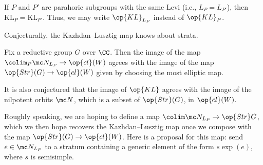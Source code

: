 \documentclass[../notes.tex]{subfiles}
\begin{document}
\begin{remark}
	If $P$ and $P'$ are parahoric subgroups with the same Levi (i.e., $L_P=L_{P'}$), then $\mathrm{KL}_{P}=\mathrm{KL}_{{P'}}$. Thus, we may write $\op{KL}_{L_P}$ instead of $\op{KL}_P$.
\end{remark}
Conjecturally, the Kazhdan--Lusztig map knows about strata.
\begin{conj}[Lusztig] \label{conj:lusztig}
	Fix a reductive group $G$ over $\CC$. Then the image of the map $\colim_P\mc N_{L_P}\to\op{cl}(W)$ agrees with the image of the map $\op{Str}(G)\to\op{cl}(W)$ given by choosing the most elliptic map.
\end{conj}
\begin{remark}
	It is also conjectured that the image of $\op{KL}$ agrees with the image of the nilpotent orbits $\mc N$, which is a subset of $\op{Str}(G)$, in $\op{cl}(W)$.
\end{remark}
\begin{remark}
	Roughly speaking, we are hoping to define a map $\colim\mc N_{L_P}\to\op{Str}G$, which we then hope recovers the Kazhdan--Lusztig map once we compose with the map $\op{Str}(G)\to\op{cl}(W)$. Here is a proposal for this map: send $e\in\mc N_{L_P}$ to a stratum containing a generic element of the form $s\exp(e)$, where $s$ is semisimple.
\end{remark}
\end{document}
